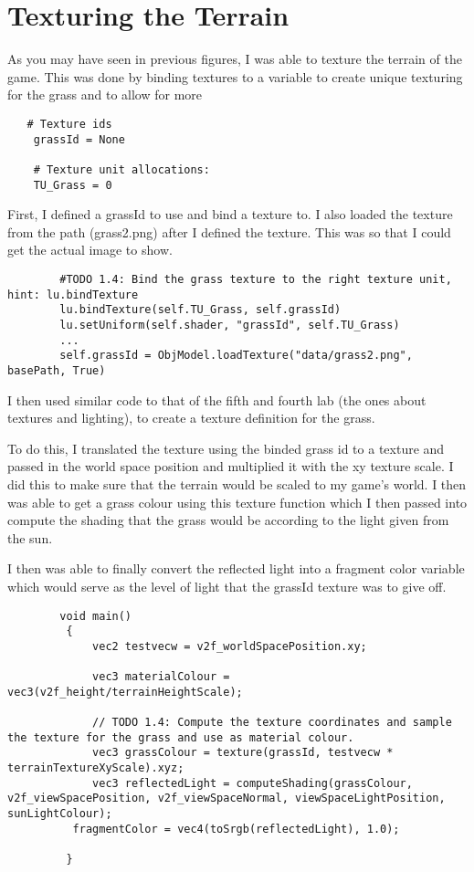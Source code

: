 \documentclass[11pt, oneside, a4paper]{article}
\begin{document}
\section{Texturing the Terrain}
As you may have seen in previous figures, I was able to texture the terrain of the game. This was done by binding textures to a variable to create unique texturing for the grass and to allow for more 

\begin{lstlisting}  
   # Texture ids
    grassId = None

    # Texture unit allocations:
    TU_Grass = 0
\end{lstlisting}

First, I defined a grassId to use and bind a texture to. I also loaded the texture from the path (grass2.png) after I defined the texture. This was so that I could get the actual image to show.
 
\begin{lstlisting}  
        #TODO 1.4: Bind the grass texture to the right texture unit, hint: lu.bindTexture
        lu.bindTexture(self.TU_Grass, self.grassId)
        lu.setUniform(self.shader, "grassId", self.TU_Grass)
        ...
        self.grassId = ObjModel.loadTexture("data/grass2.png", basePath, True)
\end{lstlisting}

I then used similar code to that of the fifth and fourth lab (the ones about textures and lighting), to create a texture definition for the grass.

To do this, I translated the texture using the binded grass id to a texture and passed in the world space position and multiplied it with the xy texture scale. I did this to make sure that the terrain would be scaled to my game's world. I then was able to get a grass colour using this texture function which I then passed into compute the shading that the grass would be according to the light given from the sun.

I then was able to finally convert the reflected light into a fragment color variable which would serve as the level of light that the grassId texture was to give off.

\begin{lstlisting}  
        void main() 
         {
             vec2 testvecw = v2f_worldSpacePosition.xy;
            
             vec3 materialColour = vec3(v2f_height/terrainHeightScale);
                
             // TODO 1.4: Compute the texture coordinates and sample the texture for the grass and use as material colour.
             vec3 grassColour = texture(grassId, testvecw * terrainTextureXyScale).xyz;
             vec3 reflectedLight = computeShading(grassColour, v2f_viewSpacePosition, v2f_viewSpaceNormal, viewSpaceLightPosition, sunLightColour);
	      fragmentColor = vec4(toSrgb(reflectedLight), 1.0);

         }
\end{lstlisting}
 
\end{document}
